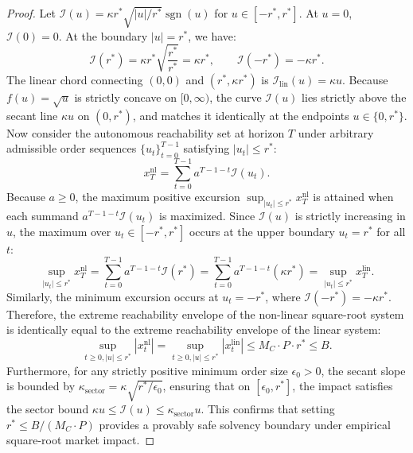 \documentclass[11pt,a4paper]{article}
\theoremstyle{definition}\newtheorem{definition}[theorem]{Definition}
\theoremstyle{remark}\newtheorem{remark}[theorem]{Remark}
\begin{document}
\begin{proof}
Let $\mathcal{I}(u) = \kappa r^* \sqrt{|u|/r^*} \operatorname{sgn}(u)$ for $u \in [-r^*, r^*]$.
At $u = 0$, $\mathcal{I}(0) = 0$. At the boundary $|u| = r^*$, we have:
\begin{equation}
\mathcal{I}(r^*) = \kappa r^* \sqrt{\frac{r^*}{r^*}} = \kappa r^*, \qquad \mathcal{I}(-r^*) = -\kappa r^*.
\end{equation}
The linear chord connecting $(0, 0)$ and $(r^*, \kappa r^*)$ is $\mathcal{I}_{\text{lin}}(u) = \kappa u$.
Because $f(u) = \sqrt{u}$ is strictly concave on $[0, \infty)$, the curve $\mathcal{I}(u)$ lies strictly above the secant line $\kappa u$ on $(0, r^*)$, and matches it identically at the endpoints $u \in \{0, r^*\}$.
Now consider the autonomous reachability set at horizon $T$ under arbitrary admissible order sequences $\{u_t\}_{t=0}^{T-1}$ satisfying $|u_t| \le r^*$:
\begin{equation}
x_T^{\text{nl}} = \sum_{t=0}^{T-1} a^{T - 1 - t} \mathcal{I}(u_t).
\end{equation}
Because $a \ge 0$, the maximum positive excursion $\sup_{|u_t| \le r^*} x_T^{\text{nl}}$ is attained when each summand $a^{T - 1 - t} \mathcal{I}(u_t)$ is maximized.
Since $\mathcal{I}(u)$ is strictly increasing in $u$, the maximum over $u_t \in [-r^*, r^*]$ occurs at the upper boundary $u_t = r^*$ for all $t$:
\begin{equation}
\sup_{|u_t| \le r^*} x_T^{\text{nl}} = \sum_{t=0}^{T-1} a^{T - 1 - t} \mathcal{I}(r^*) = \sum_{t=0}^{T-1} a^{T - 1 - t} (\kappa r^*) = \sup_{|u_t| \le r^*} x_T^{\text{lin}}.
\end{equation}
Similarly, the minimum excursion occurs at $u_t = -r^*$, where $\mathcal{I}(-r^*) = -\kappa r^*$.
Therefore, the extreme reachability envelope of the non-linear square-root system is identically equal to the extreme reachability envelope of the linear system:
\begin{equation}
\sup_{t \ge 0, |u| \le r^*} |x_t^{\text{nl}}| = \sup_{t \ge 0, |u| \le r^*} |x_t^{\text{lin}}| \le M_C \cdot P \cdot r^* \le B.
\end{equation}
Furthermore, for any strictly positive minimum order size $\epsilon_0 > 0$, the secant slope is bounded by $\kappa_{\text{sector}} = \kappa \sqrt{r^* / \epsilon_0}$, ensuring that on $[\epsilon_0, r^*]$, the impact satisfies the sector bound $\kappa u \le \mathcal{I}(u) \le \kappa_{\text{sector}} u$. This confirms that setting $r^* \le B / (M_C \cdot P)$ provides a provably safe solvency boundary under empirical square-root market impact.
\end{proof}
\end{document}
